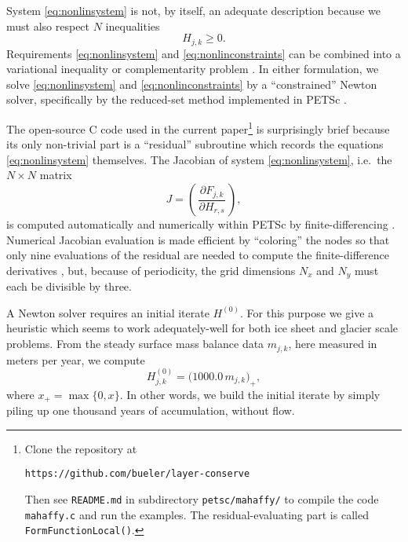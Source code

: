 \documentclass[twocolumn,letterpaper]{igs}
\begin{document}
System \eqref{eq:nonlinsystem} is not, by itself, an adequate description because we must also respect $N$ inequalities
\begin{equation}
H_{j,k} \ge 0.  \label{eq:nonlinconstraints}
\end{equation}
Requirements \eqref{eq:nonlinsystem} and \eqref{eq:nonlinconstraints} can be combined into a variational inequality \citep{JouvetBueler2012,KinderlehrerStampacchia1980} or complementarity problem \citep{BensonMunson2006}.  In either formulation, we solve \eqref{eq:nonlinsystem} and \eqref{eq:nonlinconstraints} by a ``constrained'' Newton solver, specifically by the reduced-set method \citep{BensonMunson2006} implemented in PETSc \citep{Balayetal2014}.

The open-source C code used in the current paper\footnote{Clone the repository at \begin{center}\texttt{https://github.com/bueler/layer-conserve}\end{center}  Then see \texttt{README.md} in subdirectory \texttt{petsc/mahaffy/} to compile the code \texttt{mahaffy.c} and run the examples.  The residual-evaluating part is called \texttt{FormFunctionLocal()}.} is surprisingly brief because its only non-trivial part is a ``residual'' subroutine which records the equations \eqref{eq:nonlinsystem} themselves.  The Jacobian of system \eqref{eq:nonlinsystem}, i.e.~the $N\times N$ matrix
\begin{equation}
J = \left(\,\frac{\partial F_{j,k}}{\partial H_{r,s}}\,\right),
\end{equation}
is computed automatically and numerically within PETSc by finite-differencing \citep{Kelley2003}.  Numerical Jacobian evaluation is made efficient by ``coloring'' the nodes so that only nine evaluations of the residual are needed to compute the finite-difference derivatives \citep{CurtisPowellReid1974}, but, because of periodicity, the grid dimensions $N_x$ and $N_y$ must each be divisible by three.

A Newton solver requires an initial iterate $H^{(0)}$.  For this purpose we give a heuristic which seems to work adequately-well for both ice sheet and glacier scale problems.  From the steady surface mass balance data $m_{j,k}$, here measured in meters per year, we compute
\begin{equation}
H_{j,k}^{(0)} = \big(1000.0\,m_{j,k}\big)_+,  \label{eq:nonlininitialheuristic}
\end{equation}
where $x_+ = \max\{0,x\}$.  In other words, we build the initial iterate by simply piling up one thousand years of accumulation, without flow.
\end{document}
